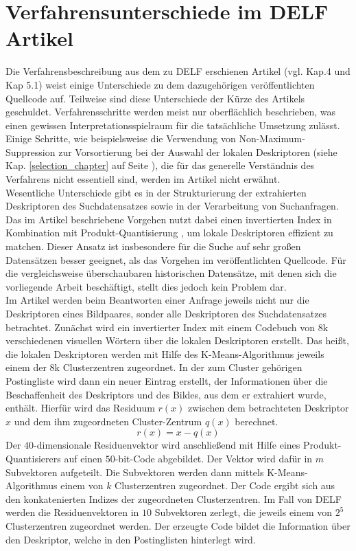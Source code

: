 \section{Verfahrensunterschiede im DELF Artikel}\label{pipeline_changes}
Die Verfahrensbeschreibung aus dem zu DELF erschienen Artikel (vgl. \cite{delf} Kap.4 und Kap 5.1) weist einige Unterschiede zu dem dazugehörigen veröffentlichten Quellcode auf. Teilweise sind diese Unterschiede der Kürze des Artikels geschuldet. Verfahrensschritte werden meist nur oberflächlich beschrieben, was einen gewissen Interpretationsspielraum für die tatsächliche Umsetzung zulässt. Einige Schritte, wie beispielsweise die Verwendung von  Non-Maximum-Suppression zur Vorsortierung bei der Auswahl der lokalen Deskriptoren (siehe Kap. \ref{selection_chapter} auf Seite \pageref{selection_chapter}), die für das generelle Verständnis des Verfahrens nicht essentiell sind, werden im Artikel nicht erwähnt.
\\
Wesentliche Unterschiede gibt es in der Strukturierung der extrahierten Deskriptoren des Suchdatensatzes sowie in der Verarbeitung von Suchanfragen. Das im Artikel beschriebene Vorgehen nutzt dabei einen invertierten Index in Kombination mit Produkt-Quantisierung \cite{pq}, um lokale Deskriptoren effizient zu matchen. Dieser Ansatz ist insbesondere für die Suche auf sehr großen Datensätzen besser geeignet, als das Vorgehen im veröffentlichten Quellcode. Für die vergleichsweise überschaubaren historischen Datensätze, mit denen sich die vorliegende Arbeit beschäftigt, stellt dies jedoch kein Problem dar. 
\\
Im Artikel werden beim Beantworten einer Anfrage jeweils nicht nur die Deskriptoren eines Bildpaares, sonder alle Deskriptoren des Suchdatensatzes betrachtet. Zunächst wird ein invertierter Index mit einem Codebuch von 8k verschiedenen visuellen Wörtern über die lokalen Deskriptoren erstellt. Das heißt, die lokalen Deskriptoren werden mit Hilfe des K-Means-Algorithmus\cite{k_means} jeweils einem der 8k Clusterzentren zugeordnet. In der zum Cluster gehörigen Postingliste wird dann ein neuer Eintrag erstellt, der Informationen über die Beschaffenheit des Deskriptors und des Bildes, aus dem er extrahiert wurde, enthält. Hierfür wird das Residuum $r(x)$ zwischen dem betrachteten Deskriptor $x$ und dem ihm zugeordneten Cluster-Zentrum $q(x)$ berechnet.
\begin{equation}
r(x) = x - q(x)
\end{equation}
Der $40$-dimensionale Residuenvektor wird anschließend mit Hilfe eines Produkt-Quantisierers auf einen $50$-bit-Code abgebildet. Der Vektor wird dafür in $m$ Subvektoren aufgeteilt. Die Subvektoren werden dann mittels K-Means-Algorithmus einem von $k$ Clusterzentren zugeordnet. Der Code ergibt sich aus den konkatenierten Indizes der zugeordneten Clusterzentren. Im Fall von DELF werden die Residuenvektoren in $10$ Subvektoren zerlegt, die jeweils einem von $2^5$ Clusterzentren zugeordnet werden. Der erzeugte Code bildet die Information über den Deskriptor, welche in den Postinglisten hinterlegt wird.
